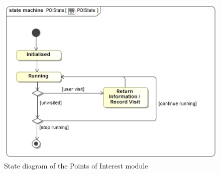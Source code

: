 \documentclass[12pt,a4paper]{article}
\begin{document}
	\begin{figure}
		\includegraphics[width=\linewidth]{Images/POIState.jpg}
		\caption{State diagram of the Points of Interest module}
	\end{figure}
\end{document}
